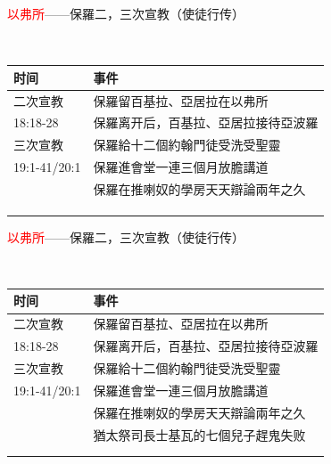 \documentclass{beamer}
\begin{document}
\begin{frame}{\textcolor{red}{以弗所}——保羅二，三次宣教（使徒行传）}
\begin{block}{}\\
\begin{table}
\centering
\begin{tabular}{l|l}
时间 & 事件 \\\hline\hline
二次宣教&保羅留百基拉、亞居拉在以弗所 \\
18:18-28&保羅离开后，百基拉、亞居拉接待亞波羅 \\\hline\hline
三次宣教&保羅給十二個約翰門徒受洗受聖靈\\
19:1-41/20:1&保羅進會堂一連三個月放膽講道\\
&保羅在推喇奴的學房天天辯論兩年之久\\
&\\
&\\
&\\\hline\hline
\end{tabular}
\end{table}
\end{block}
\end{frame}

\begin{frame}{\textcolor{red}{以弗所}——保羅二，三次宣教（使徒行传）}
\begin{block}{}\\
\begin{table}
\centering
\begin{tabular}{l|l}
时间 & 事件 \\\hline\hline
二次宣教&保羅留百基拉、亞居拉在以弗所 \\
18:18-28&保羅离开后，百基拉、亞居拉接待亞波羅 \\\hline\hline
三次宣教&保羅給十二個約翰門徒受洗受聖靈\\
19:1-41/20:1&保羅進會堂一連三個月放膽講道\\
&保羅在推喇奴的學房天天辯論兩年之久\\
&猶太祭司長士基瓦的七個兒子趕鬼失败\\
&\\
&\\\hline\hline
\end{tabular}
\end{table}
\end{block}
\end{frame}
\end{document}

